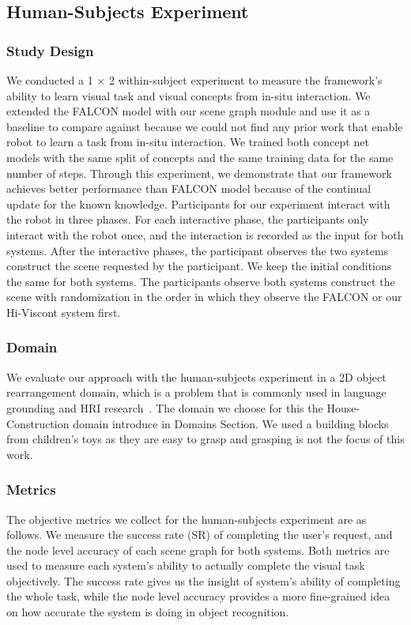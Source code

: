 \subsection{Human-Subjects Experiment}
\subsubsection{Study Design}
We conducted a 1 $\times$ 2 within-subject experiment to measure the framework's ability to learn visual task and visual concepts from in-situ interaction.
We extended the FALCON model with our scene graph module and use it as a baseline to compare against because we could not find any prior work that enable robot to learn a task from in-situ interaction.
We trained both concept net models with the same split of concepts and the same training data for the same number of steps.
Through this experiment, we demonstrate that our framework achieves better performance than FALCON model because of the continual update for the known knowledge.
Participants for our experiment interact with the robot in three phases.
For each interactive phase, the participants only interact with the robot once, and the interaction is recorded as the input for both systems.
After the interactive phases, the participant observes the two systems construct the scene requested by the participant. We keep the initial conditions the same for both systems. The participants observe both systems construct the scene with randomization in the order in which they observe the FALCON or our Hi-Viscont system first.   
\subsubsection{Domain}
We evaluate our approach with the human-subjects experiment in a 2D object rearrangement domain, which is a problem that is commonly used in language grounding and HRI research~\citep{liu2021structformer, shridhar2021cliport}.
The domain we choose for this the House-Construction domain introduce in Domains Section.
We used a building blocks from children's toys as they are easy to grasp and grasping is not the focus of this work.

\subsubsection{Metrics}
The objective metrics we collect for the human-subjects experiment are as follows. 
We measure the success rate (SR) of completing the user's request, and the node level accuracy of each scene graph for both systems.
Both metrics are used to measure each system's ability to actually complete the visual task objectively.
The success rate gives us the insight of system's ability of completing the whole task, while the node level accuracy provides a more fine-grained idea on how accurate the system is doing in object recognition.

